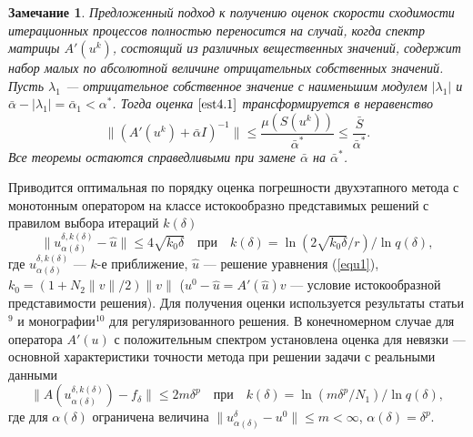 \documentclass[%
autoref,     %
href,        %
colorlinks,  %
]{disser}
\newtheorem*{remark}{Замечание}
\begin{document}
\begin{remark}%
	Предложенный подход к получению оценок скорости сходимости итерационных процессов полностью переносится на случай, когда спектр матрицы $A'(u^k)$, состоящий из различных вещественных значений, содержит набор малых по абсолютной величине отрицательных собственных значений. Пусть $\lambda _1$ --- отрицательное собственное значение с наименьшим модулем $|\lambda_1|$ и $\bar\alpha -|\lambda _1|=\bar\alpha _1<\alpha^*$. Тогда оценка $\eqref{est4.1}$ 
	трансформируется в неравенство
	$$\|(A'(u^k)+\bar\alpha I)^{-1}\|\leqslant\frac{\mu(S(u^k))}{\bar\alpha^*}\leqslant\frac{\bar S}{\bar\alpha^*}.$$
	Все теоремы остаются справедливыми при замене $\bar\alpha$ на $\bar\alpha^*$.
\end{remark}

Приводится оптимальная по порядку оценка погрешности двухэтапного метода с монотонным оператором на классе истокообразно представимых решений с правилом выбора итераций $k(\delta)$
\begin{equation*}
\|u_{\alpha(\delta)}^{\delta, k(\delta)}-\hat{u}\|\leqslant 4\sqrt{k_0 \delta}\quad \text{при}\quad k(\delta)={\ln(2\sqrt{k_0\delta}/r)}/{\ln q(\delta)},
\end{equation*}
где $u_{\alpha(\delta)}^{\delta, k(\delta)}$ --- $k$-е приближение, $\hat{u}$ --- решение уравнения (\ref{equ1}), $k_0=(1+N_2\|v\|/2)\|v\|$ ($u^0-\hat{u}=A'(\hat{u})v$ --- условие  истокообразной представимости решения). Для получения оценки используется результаты статьи$^{9}$ и монографии$^{10}$ для регуляризованного решения. В конечномерном случае для оператора $A'(u)$ с положительным спектром установлена оценка для невязки --- основной характеристики точности метода при решении задачи с реальными данными
$$\|A(u_{\alpha(\delta)}^{\delta,k(\delta)})-f_\delta\|\leqslant 2m\delta^p \quad \text{при}\quad k(\delta)=\ln(m\delta^p/N_1)/\ln q(\delta),$$
где для $\alpha(\delta)$ ограничена величина $\|u_{\alpha(\delta)}^{\delta}-u^0\|\leqslant m <\infty$, $\alpha(\delta)=\delta^p$. 
{\scriptsize
\let\thefootnote\relax\let\thefootnote\relax{}
\let\thefootnote\relax\let\thefootnote\relax{}
}
\end{document}
